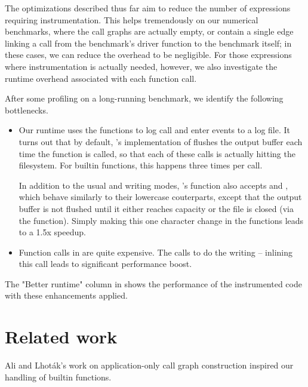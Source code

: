 The optimizations described thus far aim to reduce the number of expressions
requiring instrumentation. This helps tremendously on our numerical benchmarks,
where the call graphs are actually empty, or contain a single edge linking a
call from the benchmark's driver function to the benchmark itself; in these
cases, we can reduce the overhead to be negligible. For those expressions
where instrumentation is actually needed, however, we also investigate the
runtime overhead associated with each function call.

After some profiling on a long-running benchmark, we identify the following
bottlenecks.

\begin{itemize}

  \item Our runtime uses the  functions to log call and enter
    events to a log file. It turns out that by default, \matlab's
    implementation of  flushes the output buffer each time the
    function is called, so that each of these calls is actually hitting the
    filesystem. For builtin functions, this happens three times per call.

    In addition to the usual  and  writing modes,
    \matlab's  function also accepts  and ,
    which behave similarly to their lowercase couterparts, except that the
    output buffer is not flushed until it either reaches capacity or the file
    is closed (via the  function). Simply making this one
    character change in the  functions leads to
    a 1.5x speedup.

  \item Function calls in \matlab are quite expensive. The
     calls 
    to do the writing -- inlining this call leads to significant performance
    boost.

\end{itemize}

The "Better runtime" column in  shows the
performance of the instrumented code with these enhancements applied.

\section{Related work}

Ali and Lhot\'{a}k's work on application-only call graph construction
\cite{ApplicationOnlyCallGraphConstruction} inspired our handling of builtin
functions.
